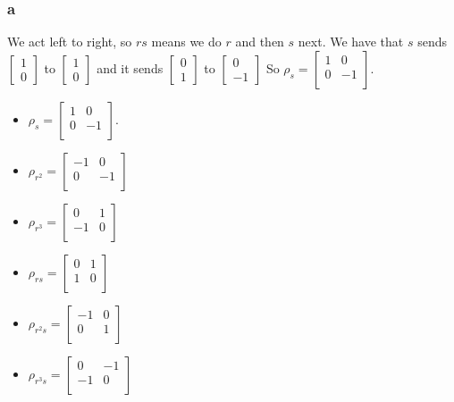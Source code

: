 \documentclass[]{article}
\begin{document}
\subsubsection{a}
We act left to right, so $rs$ means we do $r$ and then $s$ next.
We have that $s$ sends $
\begin{bmatrix}
	1\\
	0
\end{bmatrix}
$
to 
$
\begin{bmatrix}
	1\\
	0
\end{bmatrix}
$
and it sends 
$
\begin{bmatrix}
	0\\
	1
\end{bmatrix}
$
to
$
\begin{bmatrix}
	0\\
	-1
\end{bmatrix}
$
So $\rho_s =
\begin{bmatrix}
	1 & 0 \\
	0 & -1\\
\end{bmatrix}
$.
\begin{itemize}
	\item $\rho_s =
	\begin{bmatrix}
		1 & 0 \\
		0 & -1\\
	\end{bmatrix}
	$.
	\item $\rho_{r^2} = 
	\begin{bmatrix}
		-1 & 0 \\
		0 & -1\\
	\end{bmatrix}
	$
	\item $\rho_{r^3} = 
	\begin{bmatrix}
		0 & 1 \\
		-1 & 0\\
	\end{bmatrix}
	$
	\item $\rho_{rs} = 
	\begin{bmatrix}
		0 & 1 \\
		1 & 0\\
	\end{bmatrix}
	$
	\item $\rho_{r^2s} = 
	\begin{bmatrix}
		-1 & 0 \\
		0 & 1\\
	\end{bmatrix}
	$
	\item $\rho_{r^3s} = 
	\begin{bmatrix}
		0 & -1 \\
		-1 & 0\\
	\end{bmatrix}
	$
\end{itemize}
\end{document}
